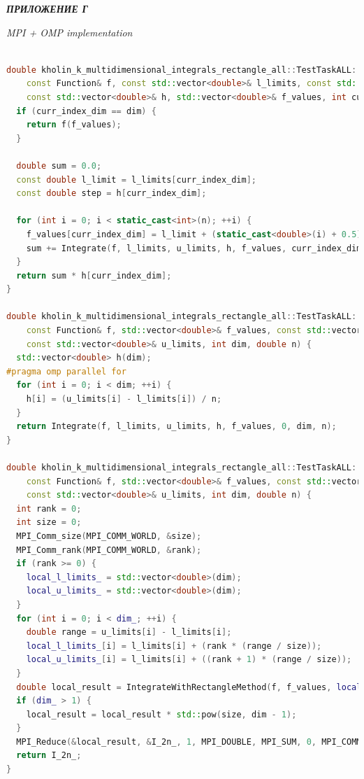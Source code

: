 \documentclass[14pt,a4paper]{article}
\begin{document}
\newpage

{\raggedright\textit{\large\bfseries ПРИЛОЖЕНИЕ Г}\par}

\textit{MPI + OMP implementation}

\begin{framed}
\begin{lstlisting}[language=C++]

double kholin_k_multidimensional_integrals_rectangle_all::TestTaskALL::Integrate(
    const Function& f, const std::vector<double>& l_limits, const std::vector<double>& u_limits,
    const std::vector<double>& h, std::vector<double>& f_values, int curr_index_dim, int dim, double n) {
  if (curr_index_dim == dim) {
    return f(f_values);
  }

  double sum = 0.0;
  const double l_limit = l_limits[curr_index_dim];
  const double step = h[curr_index_dim];

  for (int i = 0; i < static_cast<int>(n); ++i) {
    f_values[curr_index_dim] = l_limit + (static_cast<double>(i) + 0.5) * step;
    sum += Integrate(f, l_limits, u_limits, h, f_values, curr_index_dim + 1, dim, n);
  }
  return sum * h[curr_index_dim];
}

double kholin_k_multidimensional_integrals_rectangle_all::TestTaskALL::IntegrateWithRectangleMethod(
    const Function& f, std::vector<double>& f_values, const std::vector<double>& l_limits,
    const std::vector<double>& u_limits, int dim, double n) {
  std::vector<double> h(dim);
#pragma omp parallel for
  for (int i = 0; i < dim; ++i) {
    h[i] = (u_limits[i] - l_limits[i]) / n;
  }
  return Integrate(f, l_limits, u_limits, h, f_values, 0, dim, n);
}

double kholin_k_multidimensional_integrals_rectangle_all::TestTaskALL::RunMultistepSchemeMethodRectangle(
    const Function& f, std::vector<double>& f_values, const std::vector<double>& l_limits,
    const std::vector<double>& u_limits, int dim, double n) {
  int rank = 0;
  int size = 0;
  MPI_Comm_size(MPI_COMM_WORLD, &size);
  MPI_Comm_rank(MPI_COMM_WORLD, &rank);
  if (rank >= 0) {
    local_l_limits_ = std::vector<double>(dim);
    local_u_limits_ = std::vector<double>(dim);
  }
  for (int i = 0; i < dim_; ++i) {
    double range = u_limits[i] - l_limits[i];
    local_l_limits_[i] = l_limits[i] + (rank * (range / size));
    local_u_limits_[i] = l_limits[i] + ((rank + 1) * (range / size));
  }
  double local_result = IntegrateWithRectangleMethod(f, f_values, local_l_limits_, local_u_limits_, dim, n);
  if (dim_ > 1) {
    local_result = local_result * std::pow(size, dim - 1);
  }
  MPI_Reduce(&local_result, &I_2n_, 1, MPI_DOUBLE, MPI_SUM, 0, MPI_COMM_WORLD);
  return I_2n_;
}


\end{lstlisting}
\end{framed}
\end{document}

